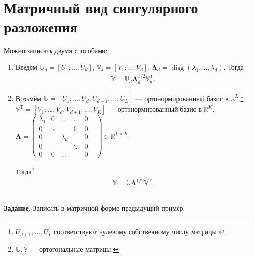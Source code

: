 \documentclass[specialist, 12pt,
subf, %
href, colorlinks=true,
substylefile = spbu.rtx,
]{disser}
\DeclareMathOperator{\diag}{diag}
\begin{document}
\section{Матричный вид сингулярного разложения}
Можно записать двумя способами:
\begin{enumerate}
	\item Введём $\mathbb{U}_d = [U_1: \ldots: U_d]$, $\mathbb{V}_d = [V_1: \ldots: V_d]$, $\bm\Lambda_d = \diag(\lambda_1, \ldots, \lambda_d)$. Тогда
	\begin{gather*}
	\mathbb{Y} = \mathbb{U}_d\bm\Lambda_d^{1/2}\mathbb{V}_d^{\mathrm{T}}.
	\end{gather*}
	\item Возьмём $\mathbb{U} = [U_1: \ldots: U_d: U_{d+1}: \ldots: U_L]$ --- ортонормированный базис в $\mathbb{R}^L$.\footnote{$U_{d+1}, \ldots, U_L$ соответствуют нулевому собственному числу матрицы.}\\
	$\mathbb{V}^\mathrm{T} = [V_1: \ldots: V_d: V_{d+1}: \ldots: V_K]$ --- ортонормированный базис в $\mathbb{R}^K$.\\
	$\bm\Lambda = \begin{pmatrix}
	\lambda_1 & 0 & \ldots & \ldots & 0\\
	0 & \ddots & & 0 & 0\\
	0 & & \lambda_d & & 0&\\
	0 & & & \ddots & 0\\
	0 & 0 & \ldots & & 0 &
	\end{pmatrix} \in \mathbb{R}^{L \times K}$.

Тогда\footnote{$\mathbb{U}, \mathbb{V}$ --- ортогональные матрицы.}
	\begin{gather*}
	\mathbb{Y} = \mathbb{U} \bm\Lambda^{1/2} \mathbb{V}^{\mathrm{T}}.
	\end{gather*}
	~\\
\end{enumerate}

\textbf{Задание}. Записать в матричной форме предыдущий пример.

\end{document}
